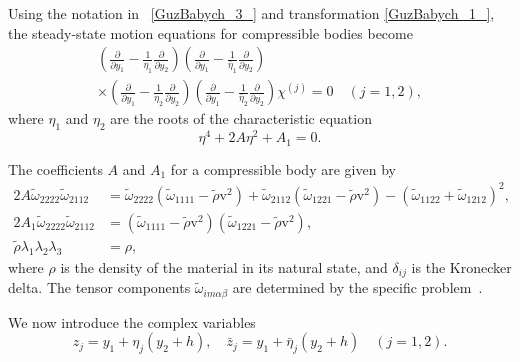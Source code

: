 Using the notation in ~\eqref{GuzBabych_3_} and transformation \eqref{GuzBabych_1_}, the steady-state motion equations for compressible bodies become
\begin{multline} \label{GuzBabych_4_}
    \left( \frac{\partial}{\partial y_{1}} - \frac{1}{\eta_{1}} \frac{\partial}{\partial y_{2}} \right)
    \left( \frac{\partial}{\partial y_{1}} - \frac{1}{\bar{\eta}_{1}} \frac{\partial}{\partial y_{2}} \right) \\
    \times
    \left( \frac{\partial}{\partial y_{1}} - \frac{1}{\eta_{2}} \frac{\partial}{\partial y_{2}} \right)
    \left( \frac{\partial}{\partial y_{1}} - \frac{1}{\bar{\eta}_{2}} \frac{\partial}{\partial y_{2}} \right)
    \chi^{(j)} = 0 \quad (j = 1,2),
\end{multline}
where $\eta_{1}$ and $\eta_{2}$ are the roots of the characteristic equation
\begin{equation} \label{GuzBabych_5_}
    \eta^{4} + 2A \eta^{2} + A_{1} = 0.
\end{equation}

The coefficients $A$ and $A_1$ for a compressible body are given by
\begin{equation} \label{GuzBabych_6_}
    \begin{aligned}
        2A \tilde{\omega}_{2222} \tilde{\omega}_{2112} &=
        \tilde{\omega}_{2222} (\tilde{\omega}_{1111} - \tilde{\rho} \mathrm{v}^{2})
        + \tilde{\omega}_{2112} (\tilde{\omega}_{1221} - \tilde{\rho} \mathrm{v}^{2})
        - (\tilde{\omega}_{1122} + \tilde{\omega}_{1212})^{2}, \\
        2A_{1} \tilde{\omega}_{2222} \tilde{\omega}_{2112} &=
        (\tilde{\omega}_{1111} - \tilde{\rho} \mathrm{v}^{2}) (\tilde{\omega}_{1221} - \tilde{\rho} \mathrm{v}^{2}), \\
        \tilde{\rho} \lambda_{1} \lambda_{2} \lambda_{3} &= \rho,
    \end{aligned}
\end{equation}
where $\rho$ is the density of the material in its natural state, and $\delta_{ij}$ is the Kronecker delta. The tensor components $\tilde{\omega}_{im\alpha\beta}$ are determined by the specific problem~\cite{GuzBabych9}.

We now introduce the complex variables
\begin{equation} \label{GuzBabych_7_}
    z_{j} = y_{1} + \eta_{j} (y_{2} + h), \quad \bar{z}_{j} = y_{1} + \bar{\eta}_{j} (y_{2} + h) \quad (j = 1,2).
\end{equation}

